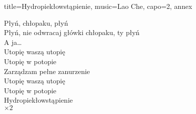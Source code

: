 \begin{song}{title={Hydropiekłowstąpienie}, music={Lao Che}, capo=2, annex}
\begin{multicols}{2}
\begin{chorus}
        Płyń, chłopaku, płyń \\
        Płyń, nie odwracaj główki chłopaku, ty płyń \\
        A ja\ldots \smallskip \\
        Utopię waszą utopię \\
        Utopię w potopie \\
        Zarządzam pełne zanurzenie \smallskip \\
        Utopię waszą utopię \\
        Utopię w potopie \\
        Hydropiekłowstąpienie \medskip \\
            $\times 2$
    \end{chorus}
\end{multicols}
\end{song}


